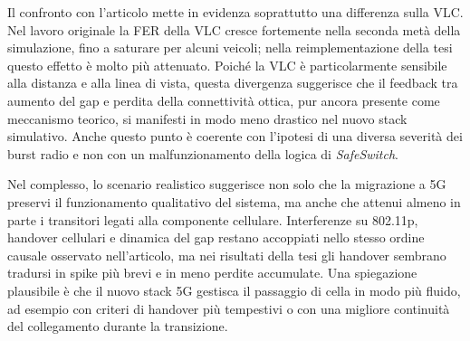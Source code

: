Il confronto con l'articolo mette in evidenza soprattutto una differenza sulla VLC. Nel lavoro originale la FER della VLC cresce fortemente nella seconda metà della simulazione, fino a saturare per alcuni veicoli; nella reimplementazione della tesi questo effetto è molto più attenuato. Poiché la VLC è particolarmente sensibile alla distanza e alla linea di vista, questa divergenza suggerisce che il feedback tra aumento del gap e perdita della connettività ottica, pur ancora presente come meccanismo teorico, si manifesti in modo meno drastico nel nuovo stack simulativo. Anche questo punto è coerente con l'ipotesi di una diversa severità dei burst radio e non con un malfunzionamento della logica di \emph{SafeSwitch}.

Nel complesso, lo scenario realistico suggerisce non solo che la migrazione a 5G preservi il funzionamento qualitativo del sistema, ma anche che attenui almeno in parte i transitori legati alla componente cellulare. Interferenze su 802.11p, handover cellulari e dinamica del gap restano accoppiati nello stesso ordine causale osservato nell'articolo, ma nei risultati della tesi gli handover sembrano tradursi in spike più brevi e in meno perdite accumulate. Una spiegazione plausibile è che il nuovo stack 5G gestisca il passaggio di cella in modo più fluido, ad esempio con criteri di handover più tempestivi o con una migliore continuità del collegamento durante la transizione.
